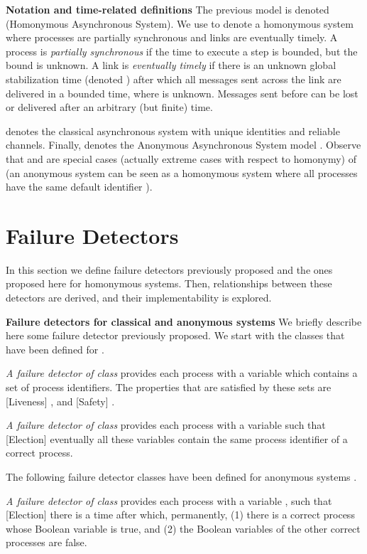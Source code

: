 \documentclass[10pt, conference, compsocconf]{IEEEtran}
\newcommand{\tightparagraph}[1]{\smallskip \noindent \textbf{#1} \hspace{1ex}}
\begin{document}
\tightparagraph{Notation and  time-related definitions}
The  previous  model is  denoted   (Homonymous
Asynchronous System). 
We  use    to  denote a  homonymous  system  where
processes  are partially  synchronous and  links are  eventually  timely. 
A
process is  \emph{partially synchronous} if the  time to execute  a step is
bounded, but  the bound is unknown.  A link is  \emph{eventually timely} if
there  is  an unknown  global  stabilization  time  (denoted )
 after  which  all
messages sent  across the  link are delivered  in a bounded   time,
where   is  unknown.  Messages sent  before   can  be lost  or
delivered after an arbitrary (but finite) time. 

 denotes the  classical asynchronous  system with
unique identities  and  reliable channels. Finally,  denotes
the  Anonymous  Asynchronous   System model  \cite{DBLP:conf/wdag/BonnetR10}.  
Observe  that    and   are  special  cases
(actually extreme cases with respect to homonymy) of 
 (an anonymous system can be seen 
as a homonymous system where
all  processes  have the  same default identifier ).


\section{Failure Detectors}
\label{sec:FDs-defintions}

In this section we define failure detectors previously proposed and the 
ones proposed here for homonymous systems. Then, relationships between 
these detectors are derived, and their implementability is explored.

\tightparagraph{Failure detectors for classical and anonymous systems}
We briefly describe here some failure detector previously proposed. 
We start with the classes that have been defined for .

\emph{A failure detector of class } 
\cite{DBLP:journals/jacm/Delporte-GalletFG10} 
provides each process  
 with a variable  which contains a set of process 
identifiers. The properties that are satisfied by these sets are 
[Liveness]  , and
[Safety] .
 
\emph{A failure detector of class }
 \cite{DBLP:journals/jacm/ChandraHT96}
provides each process   with a variable  such that 
[Election] eventually all these variables contain the same process 
identifier of a correct process.


The following failure detector classes have been defined for
 anonymous systems .
 
\emph{A failure detector of class } \cite{DBLP:conf/wdag/BonnetR10}
provides each process  with a variable , such 
that [Election] there is a time after which, permanently, (1) there is 
a correct process whose Boolean variable is true,
 and (2) the Boolean variables of the other correct processes are false.
 
\end{document}
